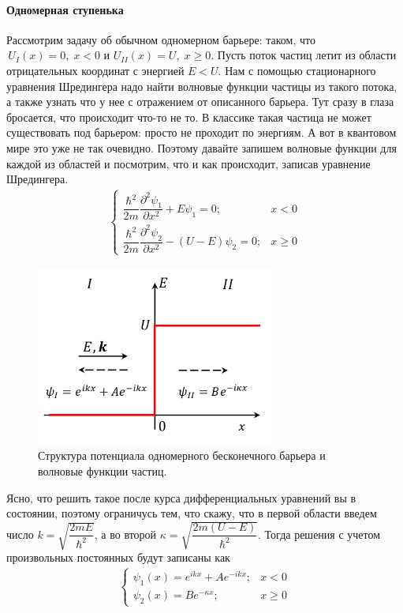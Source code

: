 \documentclass[12pt]{article}
\begin{document}
\paragraph{Одномерная ступенька}
Рассмотрим задачу об обычном одномерном барьере: таком, что $\,U_I(x) = 0,\; x<0$ и $U_{II}(x) = U,\; x \geqslant 0$. Пусть поток частиц летит из области отрицательных координат с энергией $E<U$. Нам с помощью стационарного уравнения Шредингера надо найти волновые функции частицы из такого потока, а также узнать что у нее с отражением от описанного барьера. Тут сразу в глаза бросается, что происходит что-то не то. В классике такая частица не может существовать под барьером: просто не проходит по энергиям. А вот в квантовом мире это уже не так очевидно. Поэтому давайте запишем волновые функции для каждой из областей и посмотрим, что и как происходит, записав уравнение Шредингера.
\begin{gather*}
    \begin{cases}
         \dfrac{\hbar^2}{2m}\dfrac{\partial^2\psi_1}{\partial x^2} +  E\psi_1=0; &x<0  \\[10pt]
         \dfrac{\hbar^2}{2m}\dfrac{\partial^2\psi_2}{\partial x^2} - (U - E)\psi_2=0; &x \ge 0
    \end{cases}
\end{gather*}
\begin{figure}[h]
    \centering
    \includegraphics[width=0.7\textwidth,height=\textheight,keepaspectratio]{Seminar_04/pics/pic_01.pdf}
    \caption{Структура потенциала одномерного бесконечного барьера и волновые функции частиц.}
    \label{fig:sem_04}
\end{figure}

Ясно, что решить такое после курса дифференциальных уравнений вы в состоянии\vspace{2mm}, поэтому ограничусь тем, что скажу, что в первой области введем число $k = \sqrt{\dfrac{2mE}{\hbar^2}}$, а во второй $ \kappa = \sqrt{\dfrac{2m(U -E)}{\hbar^2}}$. Тогда решения с учетом произвольных постоянных будут записаны как
\begin{gather*}
    \begin{cases}
         \psi_1(x) = e^{ikx} + A e^{-ikx}; &x<0  \\
         \psi_2(x) = Be^{-\kappa x}; &x\ge 0  
    \end{cases}
\end{gather*}
\end{document}
